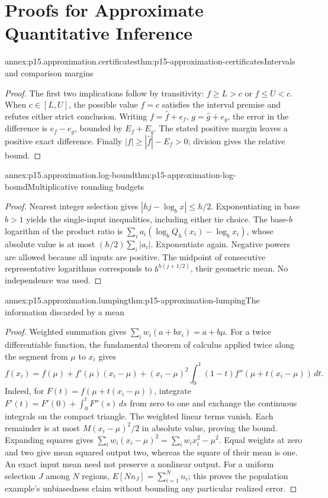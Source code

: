 \chapter{Proofs for Approximate Quantitative Inference}
\label{annex:p15-approximate-quantitative-inference}

\begin{annexitem}{annex:p15.approximation.certificates}{thm:p15-approximation-certificates}{Intervals and comparison margins}
\begin{proof}
The first two implications follow by transitivity: \(f\geq L>c\) or
\(f\leq U<c\). When \(c\in[L,U]\), the possible value \(f=c\) satisfies
the interval premise and refutes either strict conclusion. Writing
\(f=\widehat f+e_f\), \(g=\widehat g+e_g\), the error in the difference
is \(e_f-e_g\), bounded by \(E_f+E_g\). The stated positive margin
leaves a positive exact difference. Finally
\(|f|\geq|\widehat f|-E_f>0\); division gives the relative bound.
\end{proof}
\end{annexitem}

\begin{annexitem}{annex:p15.approximation.log-bound}{thm:p15-approximation-log-bound}{Multiplicative rounding budgets}
\begin{proof}
Nearest integer selection gives \(|hj-\log_bx|\leq h/2\).
Exponentiating in base \(b>1\) yields the single-input inequalities,
including either tie choice. The base-\(b\) logarithm of the product
ratio is \(\sum_i a_i(\log_bQ_h(x_i)-\log_bx_i)\), whose absolute
value is at most \((h/2)\sum_i|a_i|\). Exponentiate again.
Negative powers are allowed because all inputs are positive.
The midpoint of consecutive representative logarithms corresponds to
\(b^{h(j+1/2)}\), their geometric mean. No independence was used.
\end{proof}
\end{annexitem}

\begin{annexitem}{annex:p15.approximation.lumping}{thm:p15-approximation-lumping}{The information discarded by a mean}
\begin{proof}
Weighted summation gives \(\sum_iw_i(a+bx_i)=a+b\mu\).
For a twice differentiable function, the fundamental theorem of calculus
applied twice along the segment from \(\mu\) to \(x_i\) gives
\[
 f(x_i)=f(\mu)+f'(\mu)(x_i-\mu)
 +(x_i-\mu)^2\int_0^1(1-t)f''(\mu+t(x_i-\mu))\,dt.
\]
Indeed, for \(F(t)=f(\mu+t(x_i-\mu))\), integrate
\(F'(t)=F'(0)+\int_0^tF''(s)\,ds\) from zero to one and exchange
the continuous integrals on the compact triangle. The weighted linear
terms vanish. Each remainder is at most \(M(x_i-\mu)^2/2\) in absolute
value, proving the bound. Expanding squares gives
\(\sum_iw_i(x_i-\mu)^2=\sum_iw_ix_i^2-\mu^2\).
Equal weights at zero and two give mean squared output two, whereas the
square of their mean is one. An exact input mean need not preserve a
nonlinear output. For a uniform selection \(J\) among \(N\) regions,
\(E[Nn_J]=\sum_{i=1}^Nn_i\); this proves the population example's
unbiasedness claim without bounding any particular realized error.
\end{proof}
\end{annexitem}


